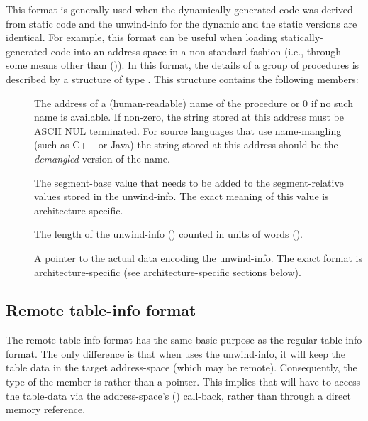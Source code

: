 \documentclass{article}
\begin{document}
This format is generally used when the dynamically generated code was
derived from static code and the unwind-info for the dynamic and the
static versions are identical.  For example, this format can be useful
when loading statically-generated code into an address-space in a
non-standard fashion (i.e., through some means other than
()).  In this format, the details of a group of procedures
is described by a structure of type .
This structure contains the following members:
\begin{description}

\item[ ] The address of a
  (human-readable) name of the procedure or 0 if no such name is
  available.  If non-zero, the string stored at this address must be
  ASCII NUL terminated.  For source languages that use name-mangling
  (such as C++ or Java) the string stored at this address should be
  the \emph{demangled} version of the name.

\item[ ] The segment-base value
  that needs to be added to the segment-relative values stored in the
  unwind-info.  The exact meaning of this value is
  architecture-specific.

\item[ ] The length of the
  unwind-info () counted in units of words
  ().

\item[ ] A pointer to the actual
  data encoding the unwind-info.  The exact format is
  architecture-specific (see architecture-specific sections below).

\end{description}

\subsection{Remote table-info format}

The remote table-info format has the same basic purpose as the regular
table-info format.  The only difference is that when 
uses the unwind-info, it will keep the table data in the target
address-space (which may be remote).  Consequently, the type of the
 member is  rather than a pointer.
This implies that  will have to access the table-data
via the address-space's () call-back, rather than
through a direct memory reference.
\end{document}
